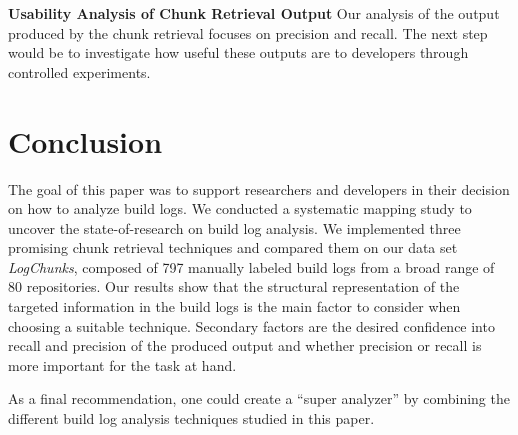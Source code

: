 \textbf{Usability Analysis of Chunk Retrieval Output}
Our
analysis of the output produced by the chunk retrieval focuses on
precision and recall.
The next step would be to investigate how useful these
outputs are to developers through controlled experiments.

\section{Conclusion}
\label{sec:conclusion-fw}
The goal of this paper was to support researchers and developers in
their decision on how to analyze build logs.
We conducted a systematic mapping study to uncover the
state-of-research on build log analysis.
We implemented	three promising chunk retrieval techniques and
compared them on our data set
\emph{LogChunks}, composed of 797 manually labeled build logs from a
broad range of 80 repositories.
Our results show that the structural
representation of the targeted information in the build logs is the
main factor to consider when choosing a suitable technique.
Secondary
factors are the desired confidence into recall and precision of the
produced output and whether precision or recall is more important for
the task at hand.

As a final recommendation, one could create a ``super analyzer'' by
combining the different build log analysis techniques studied in this
paper.
